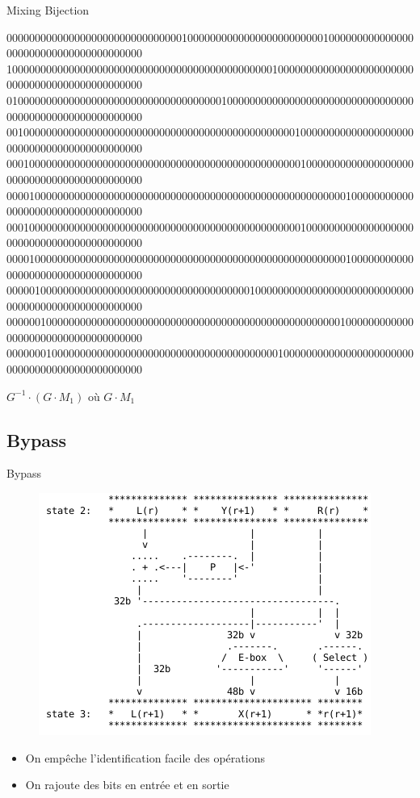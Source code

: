 \documentclass{beamer}
\begin{document}
\begin{frame}{Mixing Bijection}

  \begin{center}

    {\tiny
      000000000000000000000000000000010000000000000000000000001000000000000000000000000000000000000000
      100000000000000000000000000000000000000000000001000000000000000000000000000000000000000000000000
      010000000000000000000000000000000000001000000000000000000000000000000000000000000000000000000000
      001000000000000000000000000000000000000000000000000100000000000000000000000000000000000000000000
      000100000000000000000000000000000000000000000000000010000000000000000000000000000000000000000000
      000010000000000000000000000000000000000000000000000000000000100000000000000000000000000000000000
      000100000000000000000000000000000000000000000000000010000000000000000000000000000000000000000000
      000010000000000000000000000000000000000000000000000000000000100000000000000000000000000000000000
      000001000000000000000000000000000000000000010000000000000000000000000000000000000000000000000000
      000000100000000000000000000000000000000000000000000000000001000000000000000000000000000000000000
      000000010000000000000000000000000000000000000000100000000000000000000000000000000000000000000000
    }

    $G^{-1} \cdot (G \cdot M_1)$ où $G \cdot M_1$
  \end{center}

\end{frame}

\subsection{Bypass}

\begin{frame}[fragile]{Bypass}
  \begin{figure}[h]
    \centering
    \includegraphics[scale=0.4]{./images/state2.png}
  \end{figure}

  \begin{itemize}
  \item On empêche l'identification facile des opérations
  \item On rajoute des bits en entrée et en sortie
  \end{itemize}

\end{frame}
\end{document}
